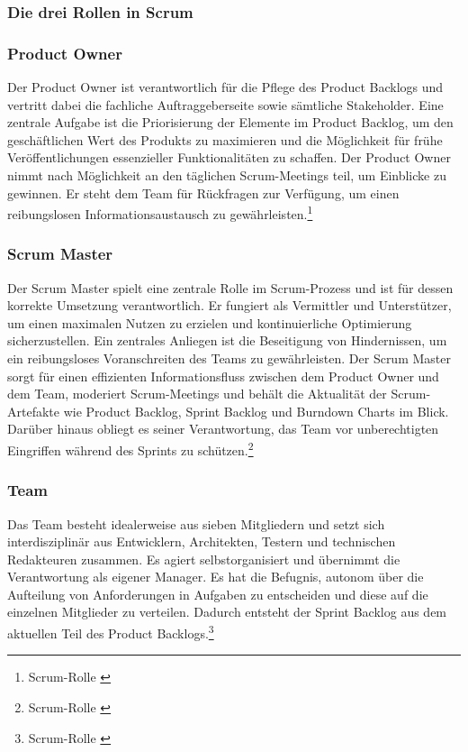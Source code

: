 \subsubsection{Die drei Rollen in Scrum}
\subsubsection*{Product Owner}
Der Product Owner ist verantwortlich für die Pflege des Product Backlogs und vertritt dabei die fachliche Auftraggeberseite
sowie sämtliche Stakeholder. Eine zentrale Aufgabe ist die Priorisierung der Elemente im Product Backlog, um den
geschäftlichen Wert des Produkts zu maximieren und die Möglichkeit für frühe Veröffentlichungen essenzieller Funktionalitäten
zu schaffen. Der Product Owner nimmt nach Möglichkeit an den täglichen Scrum-Meetings teil, um Einblicke zu gewinnen.
Er steht dem Team für Rückfragen zur Verfügung, um einen reibungslosen Informationsaustausch zu gewährleisten.\footnote{Scrum-Rolle \cite{Product Owner}}

\subsubsection*{Scrum Master}
Der Scrum Master spielt eine zentrale Rolle im Scrum-Prozess und ist für dessen korrekte Umsetzung verantwortlich. Er
fungiert als Vermittler und Unterstützer, um einen maximalen Nutzen zu erzielen und kontinuierliche Optimierung sicherzustellen.
Ein zentrales Anliegen ist die Beseitigung von Hindernissen, um ein reibungsloses Voranschreiten des Teams zu gewährleisten.
Der Scrum Master sorgt für einen effizienten Informationsfluss zwischen dem Product Owner und dem Team, moderiert Scrum-Meetings
und behält die Aktualität der Scrum-Artefakte wie Product Backlog, Sprint Backlog und Burndown Charts im Blick. Darüber
hinaus obliegt es seiner Verantwortung, das Team vor unberechtigten Eingriffen während des Sprints zu schützen.\footnote{Scrum-Rolle \cite{Scrum Master}}

\subsubsection*{Team}
Das Team besteht idealerweise aus sieben Mitgliedern und setzt sich interdisziplinär aus Entwicklern, Architekten, Testern
und technischen Redakteuren zusammen. Es agiert selbstorganisiert und übernimmt die Verantwortung als eigener Manager.
Es hat die Befugnis, autonom über die Aufteilung von Anforderungen in Aufgaben zu entscheiden und diese auf die einzelnen
Mitglieder zu verteilen. Dadurch entsteht der Sprint Backlog aus dem aktuellen Teil des Product Backlogs.\footnote{Scrum-Rolle \cite{Team}}

